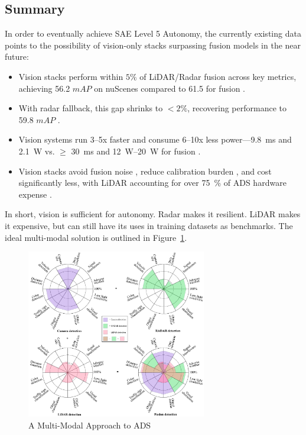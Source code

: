 \documentclass[12pt]{article}
\begin{document}
\subsection{Summary}
In order to eventually achieve SAE Level 5 Autonomy, the currently existing data points to the possibility of vision-only stacks
surpassing fusion models in the near future:
\begin{itemize}
  \item Vision stacks perform within $5\%$ of LiDAR/Radar fusion across key
		metrics, achieving 56.2 $mAP$ on nuScenes compared to 61.5 for fusion \autocite{Zhang2023MultiSensorFusionSurvey}.
  \item With radar fallback, this gap shrinks to $<2\%$, recovering performance
		to 59.8 $mAP$ \autocite{Liao2024RadarVisionFusion}.
  \item Vision systems run 3–5x faster and consume 6–10x less
		power—\SI{9.8}{\milli\second} and \SI{2.1}{\watt} vs. $\geq$ \SI{30}{\milli\second} and \SIrange{12}{20}{\watt} for fusion \autocite{Chen2024EndToEndAD, Rana2023PerceptionSystems}.
  \item Vision stacks avoid fusion noise \autocite{Rana2023PerceptionSystems}, reduce calibration burden \autocite{Han2023FourDRadarSurvey}, and cost significantly less, with LiDAR accounting for over \SI{75}{\percent} of ADS hardware expense \autocite{Shetty2022LiDARvsCamera, Sajjad2021ComparativeDetection}.
\end{itemize}

In short, vision is sufficient for autonomy. Radar makes it resilient. LiDAR
makes it expensive, but can still have its uses in training datasets as
benchmarks. The ideal multi-modal solution is outlined in
Figure~\ref{fig:multimodal}.
\begin{figure}[H]
	\centering
	\includegraphics[width=0.7\textwidth]{multimodal}
	\caption{A Multi-Modal Approach to ADS \autocite{Hasanujjaman2023}}
	\label{fig:multimodal}
\end{figure}
\end{document}
